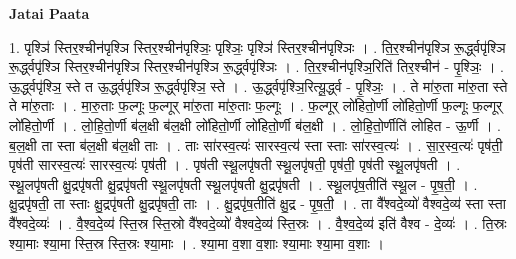 \documentclass[17pt]{extarticle}
\begin{document}
\textbf{Jatai Paata} \newline

1. पृश्ञि॑ स्तिर॒श्चीन॑पृश्ञि स्तिर॒श्चीन॑पृश्ञिः॒ पृश्ञिः॒ पृश्ञि॑ स्तिर॒श्चीन॑पृश्ञिः । . ति॒र॒श्चीन॑पृश्ञि रू॒र्द्ध्वपृ॑श्ञि रू॒र्द्ध्वपृ॑श्ञि स्तिर॒श्चीन॑पृश्ञि स्तिर॒श्चीन॑पृश्ञि रू॒र्द्ध्वपृ॑श्ञिः । . ति॒र॒श्चीन॑पृश्ञि॒रिति॑ तिर॒श्चीन॑ - पृ॒श्ञिः॒ । . ऊ॒र्द्ध्वपृ॑श्ञि॒ स्ते त ऊ॒र्द्ध्वपृ॑श्ञि रू॒र्द्ध्वपृ॑श्ञि॒ स्ते । . ऊ॒र्द्ध्वपृ॑श्ञि॒रित्यू॒र्द्ध्व - पृ॒श्ञिः॒ । . ते मा॑रु॒ता मा॑रु॒ता स्ते ते मा॑रु॒ताः । . मा॒रु॒ताः फ॒ल्गूः फ॒ल्गूर् मा॑रु॒ता मा॑रु॒ताः फ॒ल्गूः । . फ॒ल्गूर् लो॑हितो॒र्णी लो॑हितो॒र्णी फ॒ल्गूः फ॒ल्गूर् लो॑हितो॒र्णी । . लो॒हि॒तो॒र्णी ब॑ल॒क्षी ब॑ल॒क्षी लो॑हितो॒र्णी लो॑हितो॒र्णी ब॑ल॒क्षी । . लो॒हि॒तो॒र्णीति॑ लोहित - ऊ॒र्णी । . ब॒ल॒क्षी ता स्ता ब॑ल॒क्षी ब॑ल॒क्षी ताः । . ताः सा॑रस्व॒त्यः॑ सारस्व॒त्य॑ स्ता स्ताः सा॑रस्व॒त्यः॑ । . सा॒र॒स्व॒त्यः॑ पृष॑ती॒ पृष॑ती सारस्व॒त्यः॑ सारस्व॒त्यः॑ पृष॑ती । . पृष॑ती स्थू॒लपृ॑षती स्थू॒लपृ॑षती॒ पृष॑ती॒ पृष॑ती स्थू॒लपृ॑षती । . स्थू॒लपृ॑षती क्षु॒द्रपृ॑षती क्षु॒द्रपृ॑षती स्थू॒लपृ॑षती स्थू॒लपृ॑षती क्षु॒द्रपृ॑षती । . स्थू॒लपृ॑ष॒तीति॑ स्थू॒ल - पृ॒ष॒ती॒ । . क्षु॒द्रपृ॑षती॒ ता स्ताः क्षु॒द्रपृ॑षती क्षु॒द्रपृ॑षती॒ ताः । . क्षु॒द्रपृ॑ष॒तीति॑ क्षु॒द्र - पृ॒ष॒ती॒ । . ता वै᳚श्वदे॒व्यो॑ वैश्वदे॒व्य॑ स्ता स्ता वै᳚श्वदे॒व्यः॑ । . वै॒श्व॒दे॒व्य॑ स्ति॒स्र स्ति॒स्रो वै᳚श्वदे॒व्यो॑ वैश्वदे॒व्य॑ स्ति॒स्रः । . वै॒श्व॒दे॒व्य॑ इति॑ वैश्व - दे॒व्यः॑ । . ति॒स्रः श्या॒माः श्या॒मा स्ति॒स्र स्ति॒स्रः श्या॒माः । . श्या॒मा व॒शा व॒शाः श्या॒माः श्या॒मा व॒शाः । \newline
\end{document}
